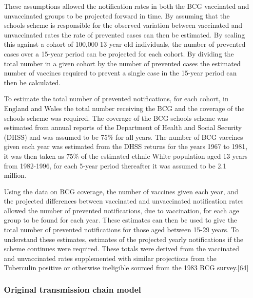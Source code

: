 \documentclass[11pt,twoside]{bristolthesis}
\begin{document}
  These assumptions allowed the notification rates in both the BCG vaccinated and unvaccinated groups to be projected forward in time. By assuming that the schools scheme is responsible for the observed variation between vaccinated and unvaccinated rates the rate of prevented cases can then be estimated. By scaling this against a cohort of 100,000 13 year old individuals, the number of prevented cases over a 15-year period can be projected for each cohort. By dividing the total number in a given cohort by the number of prevented cases the estimated number of vaccines required to prevent a single case in the 15-year period can then be calculated.
  
  To estimate the total number of prevented notifications, for each cohort, in England and Wales the total number receiving the BCG and the coverage of the schools scheme was required. The coverage of the BCG schools scheme was estimated from annual reports of the Department of Health and Social Security (DHSS) and was assumed to be 75\% for all years. The number of BCG vaccines given each year was estimated from the DHSS returns for the years 1967 to 1981, it was then taken as 75\% of the estimated ethnic White population aged 13 years from 1982-1996, for each 5-year period thereafter it was assumed to be 2.1 million.
  
  Using the data on BCG coverage, the number of vaccines given each year, and the projected differences between vaccinated and unvaccinated notification rates allowed the number of prevented notifications, due to vaccination, for each age group to be found for each year. These estimates can then be used to give the total number of prevented notifications for those aged between 15-29 years. To understand these estimates, estimates of the projected yearly notifications if the scheme continues were required. These totals were derived from the vaccinated and unvaccinated rates supplemented with similar projections from the Tuberculin positive or otherwise ineligible sourced from the 1983 BCG survey.{[}\protect\hyperlink{ref-Sutherland1987a}{64}{]}
  
  \hypertarget{original-transmission-chain-model}{%
  \subsubsection{Original transmission chain model}\label{original-transmission-chain-model}}
  
\end{document}
